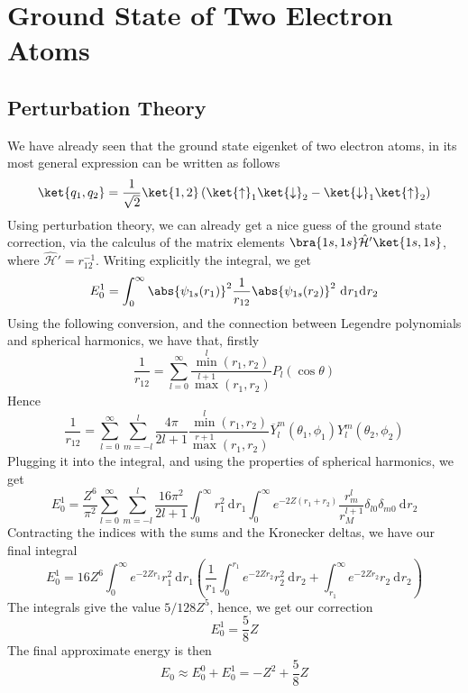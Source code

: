 \documentclass[a4paper, 11pt]{book}
\newcommand{\1}{\opr{\mathds{1}}}
\newcommand{\diff}[2][]{\ \mathrm{d}^{#1}#2}
\newcommand{\ddiff}[3][]{\ \mathrm{d}^{#1}#2\mathrm{d}^{#1}#3}
\newcommand{\ham}{\mathcal{H}}
\newcommand{\opr}[1]{\hat{#1}}
\newcommand{\cc}[1]{\overline{#1}}
\newcommand{\kd}[1]{\delta_{#1}}
\newcommand{\up}{\uparrow}
\newcommand{\down}{\downarrow}
\theoremstyle{plain}
\begin{document}
	\section{Ground State of Two Electron Atoms}
	\subsection{Perturbation Theory}
	We have already seen that the ground state eigenket of two electron atoms, in its most general expression can be written as follows
	\begin{equation}
		\ket{q_1,q_2}=\frac{1}{\sqrt{2}}\ket{1,2}\left( \ket{\up}_1\ket{\down}_2-\ket{\down}_1\ket{\up}_2 \right)
		\label{eq:2eminusatomgsstate}
	\end{equation}
	Using perturbation theory, we can already get a nice guess of the ground state correction, via the calculus of the matrix elements $\bra{1s,1s}\opr{\ham}'\ket{1s,1s}$, where $\opr{\ham}'=r_{12}^{-1}$. Writing explicitly the integral, we get
	\begin{equation}
		E_0^1=\int_{0}^{\infty}\abs{\psi_{1s}(r_1)}^2\frac{1}{r_{12}}\abs{\psi_{1s}(r_2)}^2\ddiff{r_1}{r_2}
		\label{eq:ptgspert}
	\end{equation}
	Using the following conversion, and the connection between Legendre polynomials and spherical harmonics, we have that, firstly
	\begin{equation*}
		\frac{1}{r_{12}}=\sum_{l=0}^{\infty}\frac{\min^l(r_1,r_2)}{\max^{l+1}(r_1,r_2)}P_l(\cos\theta)
	\end{equation*}
	Hence
	\begin{equation*}
		\frac{1}{r_{12}}=\sum_{l=0}^{\infty}\sum_{m=-l}^l\frac{4\pi}{2l+1}\frac{\min^l(r_1,r_2)}{\max^{r+1}(r_1,r_2)}\cc{Y}^m_l(\theta_1,\phi_1)Y^m_l(\theta_2,\phi_2)
	\end{equation*}
	Plugging it into the integral, and using the properties of spherical harmonics, we get
	\begin{equation*}
		E_0^1=\frac{Z^6}{\pi^2}\sum_{l=0}^{\infty}\sum_{m=-l}^l\frac{16\pi^2}{2l+1}\int_{0}^{\infty}r_1^2\diff{r_1}\int_{0}^{\infty}e^{-2Z(r_1+r_2)}\frac{r_m^l}{r_M^{l+1}}\kd{l0}\kd{m0}\diff{r_2}
	\end{equation*}
	Contracting the indices with the sums and the Kronecker deltas, we have our final integral
	\begin{equation}
		E_0^1=16Z^6\int_{0}^{\infty}e^{-2Zr_1}r_1^2\diff{r_1}\left( \frac{1}{r_1}\int_{0}^{r_1}e^{-2Zr_2}r_2^2\diff{r_2}+\int_{r_1}^{\infty}e^{-2Zr_2}r_2\diff{r_2} \right)
		\label{eq:energygshegspt}
	\end{equation}
	The integrals give the value $5/128 Z^5$, hence, we get our correction
	\begin{equation}
		E_0^1=\frac{5}{8}Z
		\label{eq:pthegscorr}
	\end{equation}
	The final approximate energy is then
	\begin{equation}
		E_0\approx E_0^0+E_0^1=-Z^2+\frac{5}{8}Z
		\label{eq:pthecorrtotal}
	\end{equation}
\end{document}
